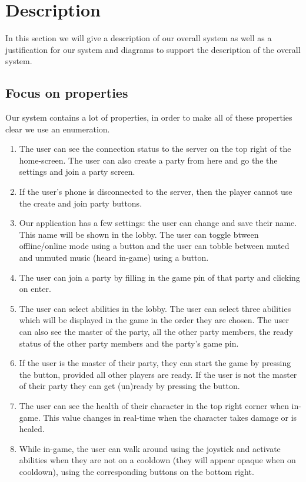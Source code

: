 \documentclass[../main.tex]{subfiles}
\begin{document}
\pagebreak
\section{Description}
In this section we will give a description of our overall system as well as a justification for our system and diagrams to support the description of the overall system.

    \subsection{Focus on properties}
	Our system contains a lot of properties, in order to make all of these properties clear we use an enumeration.
	\begin{enumerate}
		\item The user can see the connection status to the server on the top right of the home-screen. The user can also create a party from here and go the the settings and join a party screen.
		\item If the user's phone is disconnected to the server, then the player cannot use the create and join party buttons.
		\item Our application has a few settings: the user can change and save their name. This name will be shown in the lobby. The user can toggle btween offline/online mode using a button and the user can tobble between muted and unmuted music (heard in-game) using a button.
		\item The user can join a party by filling in the game pin of that party and clicking on enter.
		\item The user can select abilities in the lobby. The user can select three abilities which will be displayed in the game in the order they are chosen. The user can also see the master of the party, all the other party members, the ready status of the other party members and the party's game pin.
		\item If the user is the master of their party, they can start the game by pressing the button, provided all other players are ready. If the user is not the master of their party they can get (un)ready by pressing the button.
		\item The user can see the health of their character in the top right corner when in-game. This value changes in real-time when the character takes damage or is healed.
		\item While in-game, the user can walk around using the joystick and activate abilities when they are not on a cooldown (they will appear opaque when on cooldown), using the corresponding buttons on the bottom right. 

\end{enumerate}
\end{document}
